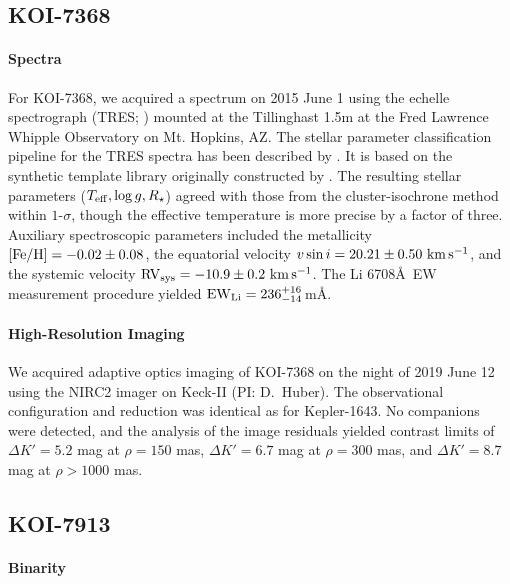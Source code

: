 \documentclass[12pt,twocolumn,linenumbers]{aastex63}
\newcommand{\mkms}{{\rm \,km\,s^{-1}}}  %
\begin{document}
\subsection{KOI-7368}
\paragraph{Spectra}
For KOI-7368, we acquired a spectrum on 2015 June 1 using the echelle
spectrograph (TRES; \citealt{furesz_tres_2008}) mounted at the
Tillinghast 1.5m at the Fred Lawrence Whipple Observatory on Mt.
Hopkins, AZ.  The stellar parameter classification pipeline for the
TRES spectra has been described by \citet{2021tsc2.confE.124B}.  It is
based on the synthetic template library originally constructed by
\citet{buchhave_hatp16b_class_2010}.  The resulting stellar parameters
($T_{\rm eff}, \log g, R_\star$) agreed with those from the
cluster-isochrone method within $1$-$\sigma$, though the effective
temperature is more precise by a factor of three.  Auxiliary
spectroscopic parameters included the metallicity $[{\rm Fe/H}]= -0.02
\pm 0.08$, the equatorial velocity $v\sin i = 20.21 \pm 0.50\,\mkms$,
and the systemic velocity ${\rm RV}_{\rm sys} = -10.9 \pm 0.2\,\mkms$.
The Li 6708\AA\ EW measurement procedure yielded ${\rm EW}_{\rm Li} =
236^{+16}_{-14}$\,m\AA.

\paragraph{High-Resolution Imaging}
We acquired adaptive optics imaging of KOI-7368 on the night of 2019
June 12 using the NIRC2 imager on Keck-II (PI: D.~Huber).  The
observational configuration and reduction was identical as for
Kepler-1643.  No companions were detected, and the analysis of the
image residuals yielded contrast limits of $\Delta K' = 5.2$ mag at
$\rho = 150$ mas, $\Delta K' = 6.7$ mag at $\rho = 300$ mas, and
$\Delta K' = 8.7$ mag at $\rho > 1000$ mas.


\subsection{KOI-7913}

\paragraph{Binarity}
\end{document}
